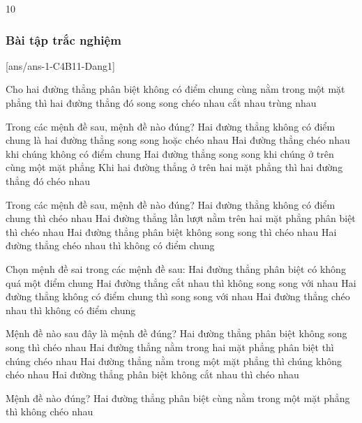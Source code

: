 \begin{indapan}{10}
\subsubsection{Bài tập trắc nghiệm}
[ans/ans-1-C4B11-Dang1]
\begin{ex}%
	Cho hai đường thẳng phân biệt không có điểm chung cùng nằm trong một mặt phẳng thì hai đường thẳng đó
	\choice
	{\True song song}
	{chéo nhau}
	{cắt nhau}
	{trùng nhau}
	\loigiai{
	}
\end{ex}
\begin{ex}%
	Trong các mệnh đề sau, mệnh đề nào đúng?
	\choice
	{\True Hai đường thẳng không có điểm chung là hai đường thẳng song song hoặc chéo nhau}
	{Hai đường thẳng chéo nhau khi chúng không có điểm chung}
	{Hai đường thẳng song song khi chúng ở trên cùng một mặt phẳng}
	{Khi hai đường thẳng ở trên hai mặt phẳng thì hai đường thẳng đó chéo nhau}
	\loigiai{
	}
\end{ex}
\begin{ex}%
	Trong các mệnh đề sau, mệnh đề nào đúng?
	\choice
	{Hai đường thẳng không có điểm chung thì chéo nhau}
	{Hai đường thẳng lần lượt nằm trên hai mặt phẳng phân biệt thì chéo nhau}
	{Hai đường thẳng phân biệt không song song thì chéo nhau}
	{\True Hai đường thẳng chéo nhau thì không có điểm chung}
	\loigiai{
	}
\end{ex}
\begin{ex}%
	Chọn mệnh đề sai trong các mệnh đề sau:
	\choice
	{Hai đường thẳng phân biệt có không quá một điểm chung}
	{Hai đường thẳng cắt nhau thì không song song với nhau}
	{\True Hai đường thẳng không có điểm chung thì song song với nhau}
	{Hai đường thẳng chéo nhau thì không có điểm chung}
	\loigiai{
	}
\end{ex}
\begin{ex}%
	Mệnh đề nào sau đây là mệnh đề đúng?
	\choice
	{Hai đường thẳng phân biệt không song song thì chéo nhau}
	{Hai đường thẳng nằm trong hai mặt phẳng phân biệt thì chúng chéo nhau}
	{\True Hai đường thẳng nằm trong một mặt phẳng thì chúng không chéo nhau}
	{Hai đường thẳng phân biệt không cắt nhau thì chéo nhau}
	\loigiai{
	}
\end{ex}
\begin{ex}%
	Mệnh đề nào đúng?
	\choice
	{\True Hai đường thẳng phân biệt cùng nằm trong một mặt phẳng thì không chéo nhau}

\end{ex}
\end{indapan}
